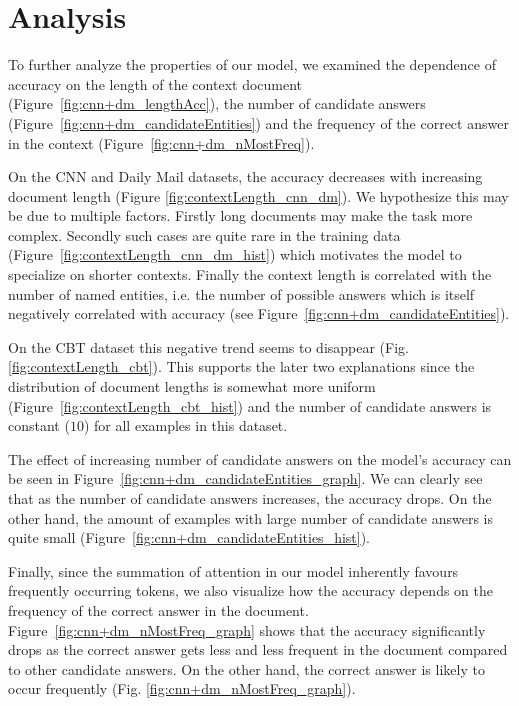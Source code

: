 \documentclass[11pt]{article}
\newcommand{\ONDRA}[1]{{\color{black}#1}}
\begin{document}
\ONDRA{
\section{Analysis}
\label{sec:analysis}



To further analyze the properties of our model, we examined the dependence of accuracy on the length of the context document (Figure~\ref{fig:cnn+dm_lengthAcc}), the number of candidate answers (Figure~\ref{fig:cnn+dm_candidateEntities}) and the frequency of the correct answer in the context (Figure~\ref{fig:cnn+dm_nMostFreq}).

On the CNN and Daily Mail  datasets, the accuracy decreases with increasing document length (Figure \ref{fig:contextLength_cnn_dm}). 
We hypothesize this may be due to multiple factors. 
Firstly long documents may make the task more complex. 
Secondly such cases are quite rare in the training data (Figure~\ref{fig:contextLength_cnn_dm_hist}) which motivates the model to specialize on shorter contexts. 
Finally the context length is correlated with the number of named entities, i.e. the number of possible answers which is itself negatively correlated with accuracy (see Figure~\ref{fig:cnn+dm_candidateEntities}).

On the CBT dataset this negative trend seems to disappear (Fig. \ref{fig:contextLength_cbt}).
This supports the later two explanations since the distribution of document lengths is somewhat more uniform (Figure~\ref{fig:contextLength_cbt_hist})
and the number of candidate answers is constant ($10$) for all examples in this dataset. 

The effect of increasing number of candidate answers on the model's accuracy can be seen in Figure~\ref{fig:cnn+dm_candidateEntities_graph}.
We can clearly see that as the number of candidate answers increases, the accuracy drops. 
On the other hand, the amount of examples with large number of candidate answers is quite small (Figure~\ref{fig:cnn+dm_candidateEntities_hist}).

Finally, since the summation of attention in our model inherently favours frequently occurring tokens, we also visualize how the accuracy depends on the frequency of the correct answer in the document.
Figure~\ref{fig:cnn+dm_nMostFreq_graph} shows that the accuracy significantly drops as the correct answer gets less and less frequent in the document compared to other candidate answers.
On the other hand, the correct answer is likely to occur frequently (Fig. \ref{fig:cnn+dm_nMostFreq_graph}).

}
\end{document}
